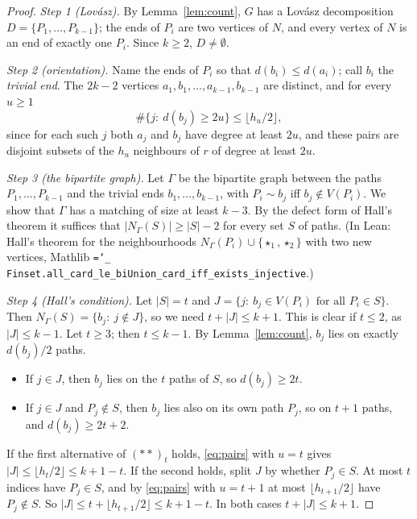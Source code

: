 \documentclass[11pt]{amsart}
\theoremstyle{definition}
\newcommand{\lean}[1]{\texttt{\hyphenchar\font=`\_ #1}}
\begin{document}
\begin{proof}
\emph{Step 1 (Lov\'asz).} By Lemma~\ref{lem:count}, $G$ has a Lov\'asz decomposition
$D=\{P_1,\dots,P_{k-1}\}$; the ends of $P_i$ are two vertices of $N$, and every vertex of $N$ is an
end of exactly one $P_i$. Since $k\ge2$, $D\neq\emptyset$.

\emph{Step 2 (orientation).} Name the ends of $P_i$ so that $d(b_i)\le d(a_i)$; call $b_i$ the
\emph{trivial end}. The $2k-2$ vertices $a_1,b_1,\dots,a_{k-1},b_{k-1}$ are distinct, and for every
$u\ge 1$
\begin{equation}\label{eq:pairs}
\#\{j:\ d(b_j)\ge 2u\}\le\lfloor h_u/2\rfloor ,
\end{equation}
since for each such $j$ both $a_j$ and $b_j$ have degree at least $2u$, and these pairs are disjoint
subsets of the $h_u$ neighbours of $r$ of degree at least $2u$.

\emph{Step 3 (the bipartite graph).} Let $\Gamma$ be the bipartite graph between the paths
$P_1,\dots,P_{k-1}$ and the trivial ends $b_1,\dots,b_{k-1}$, with $P_i\sim b_j$ iff $b_j\notin
V(P_i)$. We show that $\Gamma$ has a matching of size at least $k-3$. By the defect form of Hall's
theorem it suffices that $|N_\Gamma(S)|\ge|S|-2$ for every set $S$ of paths. (In Lean: Hall's theorem
for the neighbourhoods $N_\Gamma(P_i)\cup\{\star_1,\star_2\}$ with two new vertices, Mathlib
\lean{Finset.all\_card\_le\_biUnion\_card\_iff\_exists\_injective}.)

\emph{Step 4 (Hall's condition).} Let $|S|=t$ and $J=\{j:\ b_j\in V(P_i)\text{ for all }P_i\in S\}$.
Then $N_\Gamma(S)=\{b_j:\ j\notin J\}$, so we need $t+|J|\le k+1$. This is clear if $t\le2$, as $|J|\le
k-1$. Let $t\ge3$; then $t\le k-1$. By Lemma~\ref{lem:count}, $b_j$ lies on exactly $d(b_j)/2$ paths.
\begin{itemize}[leftmargin=*]
\item If $j\in J$, then $b_j$ lies on the $t$ paths of $S$, so $d(b_j)\ge 2t$.
\item If $j\in J$ and $P_j\notin S$, then $b_j$ lies also on its own path $P_j$, so on $t+1$ paths,
and $d(b_j)\ge 2t+2$.
\end{itemize}
If the first alternative of $(\ast\ast)_t$ holds, \eqref{eq:pairs} with $u=t$ gives $|J|\le\lfloor
h_t/2\rfloor\le k+1-t$. If the second holds, split $J$ by whether $P_j\in S$. At most $t$ indices
have $P_j\in S$, and by \eqref{eq:pairs} with $u=t+1$ at most $\lfloor h_{t+1}/2\rfloor$ have
$P_j\notin S$. So $|J|\le t+\lfloor h_{t+1}/2\rfloor\le k+1-t$. In both cases $t+|J|\le k+1$.


\end{proof}
\end{document}
